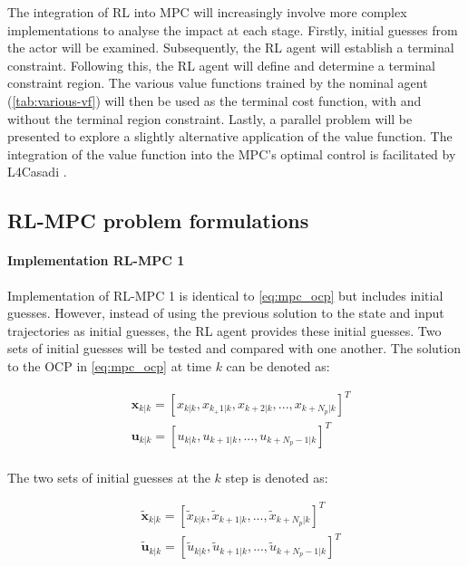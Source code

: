 The integration of RL into MPC will increasingly involve more complex implementations to analyse the impact at each stage. Firstly, initial guesses from the actor will be examined. Subsequently, the RL agent will establish a terminal constraint. Following this, the RL agent will define and determine a terminal constraint region. The various value functions trained by the nominal agent (\autoref{tab:various-vf}) will then be used as the terminal cost function, with and without the terminal region constraint. Lastly, a parallel problem will be presented to explore a slightly alternative application of the value function. The integration of the value function into the MPC’s optimal control is facilitated by L4Casadi \cite{}.

\subsection{RL-MPC problem formulations}

\paragraph{Implementation RL-MPC 1}
Implementation of RL-MPC 1 is identical to \autoref{eq:mpc_ocp} but includes initial guesses. However, instead of using the previous solution to the state and input trajectories as initial guesses, the RL agent provides these initial guesses. Two sets of initial guesses will be tested and compared with one another. The solution to the OCP in \autoref{eq:mpc_ocp} at time $k$ can be denoted as:

\begin{equation}\label{eq:sol-mpc-ocp}
	\begin{aligned}
		&\mathbf{x}_{k|k} = [x_{k|k},x_{k_+ 1|k},x_{k + 2|k}, ...,x_{k + N_p|k}]^T \\ 
		&\mathbf{u}_{k|k} = [u_{k|k},u_{k + 1|k}, ...,u_{k + N_p-1|k}]^T \\
	\end{aligned}
\end{equation}

The two sets of initial guesses at the $k$ step is denoted as:

\begin{equation}\label{eq:initial-guess-1}
	\begin{aligned}
		&\tilde{\mathbf{x}}_{k|k} = [\tilde{x}_{k|k},\tilde{x}_{k+1|k},...,\tilde{x}_{k + N_p|k}]^T \\ 
		&\tilde{\mathbf{u}}_{k|k} = [\tilde{u}_{k|k},\tilde{u}_{k + 1|k},...,\tilde{u}_{k + N_p - 1|k}]^T\\ 
	\end{aligned}
\end{equation}


